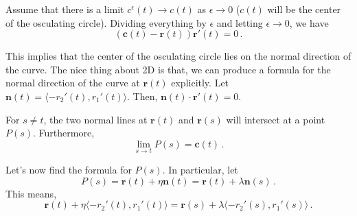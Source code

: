 \documentclass[12pt]{amsart}
\newcommand{\vect}{\mathbf}
\begin{document}
     Assume that there is a limit $c^\epsilon(t) \to c(t)$ as $\epsilon \to 0$ ($c(t)$ will be the center of the osculating circle).
     Dividing everything by $\epsilon$ and letting $\epsilon\to 0$, we have
     \begin{equation*}
         \left( \vect{c}(t) - \vect{r}(t) \right) \vect{r}'(t) = 0 \,.
     \end{equation*}

     This implies that the center of the osculating circle lies on the normal direction of 
     the curve. 
     The nice thing about 2D is that, we can produce a formula for the normal direction of the
     curve at $\vect{r}(t)$ explicitly.
     Let $\vect{n}(t) = \langle -r_2'(t) , r_1'(t) \rangle$.
     Then, $\vect{n}(t) \cdot \vect{r}'(t) = 0$.

     For $s\not= t$, the two normal lines at $\vect{r}(t)$ and $\vect{r}(s)$ will intersect
     at a point $P(s)$. Furthermore,
     \begin{equation*}
     \lim_{s\to t} P(s) = \vect{c}(t) \,.
     \end{equation*}

     Let's now find the formula for $P(s)$.
     In particular, let
     \begin{equation*}
         P(s) = \vect{r}(t) + \eta \vect{n}(t) = \vect{r}(t) + \lambda \vect{n}(s)  \,.
     \end{equation*}
     This means,
     \begin{equation*}
         \vect{r}(t) + \eta \langle -r_2'(t) , r_1'(t) \rangle = \vect{r}(s) + \lambda \langle -r_2'(s), r_1'(s) \rangle \,.
     \end{equation*}
\end{document}
